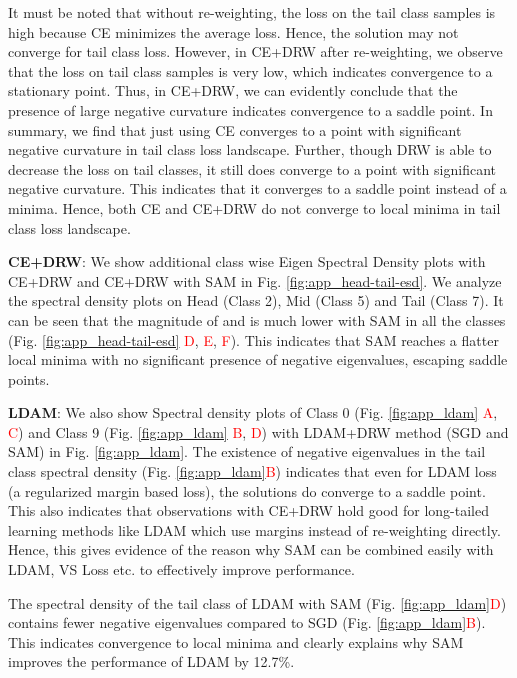 \documentclass{article}
\begin{document}
It must be noted that without re-weighting, the loss on the tail class samples is high because CE minimizes the average loss. Hence, the solution may not converge for tail class loss. However, in CE+DRW after re-weighting, we observe that the loss on tail class samples is very low, which indicates convergence to a stationary point. Thus, in CE+DRW, we can evidently conclude that the presence of large negative curvature indicates convergence to a saddle point. In summary, we find that just using CE converges to a point with significant negative curvature in tail class loss landscape. Further, though DRW is able to decrease the loss on tail classes, it still does converge to a point with significant negative curvature. This indicates that it converges to a saddle point instead of a minima. Hence, both CE and CE+DRW do not converge to local minima in tail class loss landscape. 




\vspace{1mm}\noindent \textbf{CE+DRW}: We show additional class wise Eigen Spectral Density plots with CE+DRW and CE+DRW with SAM in Fig. \ref{fig:app_head-tail-esd}. We analyze the spectral density plots on Head (Class 2), Mid (Class 5) and Tail (Class 7). It can be seen that the magnitude of  and  is much lower with SAM in all the classes (Fig. \ref{fig:app_head-tail-esd} \textcolor{red}{D}, \textcolor{red}{E}, \textcolor{red}{F}). This indicates that SAM reaches a flatter local minima with no significant presence of negative eigenvalues, escaping saddle points. 

\vspace{1mm}\noindent \textbf{LDAM}: We also show Spectral density plots of Class 0 (Fig. \ref{fig:app_ldam} \textcolor{red}{A}, \textcolor{red}{C}) and Class 9 (Fig. \ref{fig:app_ldam} \textcolor{red}{B}, \textcolor{red}{D}) with LDAM+DRW method (SGD and SAM) in Fig. \ref{fig:app_ldam}. The existence of negative eigenvalues in the tail class spectral density (Fig. \ref{fig:app_ldam}\textcolor{red}{B}) indicates that even for LDAM loss (a regularized margin based loss), the solutions do converge to a saddle point. This also indicates that observations with CE+DRW hold good for long-tailed learning methods like LDAM which use margins instead of re-weighting directly. Hence, this gives evidence of the reason why SAM can be combined easily with  LDAM, VS Loss etc. to effectively improve performance. 



The spectral density of the tail class of LDAM with SAM (Fig. \ref{fig:app_ldam}\textcolor{red}{D}) contains fewer negative eigenvalues compared to SGD (Fig. \ref{fig:app_ldam}\textcolor{red}{B}). This indicates convergence to local minima and clearly explains why SAM improves the performance of LDAM by 12.7\%.
\\
\end{document}
